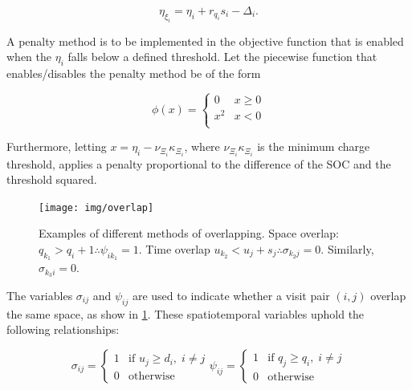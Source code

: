 \documentclass[11pt,a4paper,final]{article}
\begin{document}
\begin{equation}
\label{eq:bat-chain}
  \eta_{\xi_i} = \eta_i + r_{q_i}s_i - \Delta_i\text{.}
\end{equation}

A penalty method is to be implemented in the objective function that is enabled when the \(\eta_i\) falls below a defined
threshold. Let the piecewise function that enables/disables the penalty method be of the form

\begin{equation}
\label{eq:penalty}
  \phi(x) =
  \begin{cases}
    0   & x \ge 0 \\
    x^2 & x < 0\\
  \end{cases}
\end{equation}

Furthermore, letting \(x = \eta_i - \nu_{\Xi_i} \kappa_{\Xi_i}\), where \(\nu_{\Xi_i} \kappa_{\Xi_i}\) is the minimum charge threshold, applies a penalty
proportional to the difference of the SOC and the threshold squared.

\begin{figure}[htpb]
  \centering \texttt{[image: img/overlap]}
  \caption{Examples of different methods of overlapping. Space overlap: $q_{k_1} > q_{i} + 1 \therefore \psi_{ik_{1}} = 1$.
    Time overlap $u_{k_2} < u_{j} + s_j \therefore \sigma_{k_{2}j} = 0$. Similarly, $\sigma_{k_3 i} = 0$.}
  \label{fig:overlap}
\end{figure}

The variables \(\sigma_{ij}\) and \(\psi_{ij}\) are used to indicate whether a visit pair \((i, j)\) overlap the same space, as show
in \ref{fig:overlap}. These spatiotemporal variables uphold the following relationships:

\begin{subequations}
\label{eq:bus-spat-temp}
\begin{equation}
  \sigma_{ij} =
  \begin{cases}
    1 & \text{if } u_j \ge d_i, \; i \ne j\\
    0 & \text{otherwise}
  \end{cases}
\end{equation}

\begin{equation}
  \psi_{ij} =
  \begin{cases}
    1 & \text{if } q_j \ge q_i,\; i \ne j\\
    0 & \text{otherwise}
  \end{cases}
\end{equation}
\end{subequations}
\end{document}
